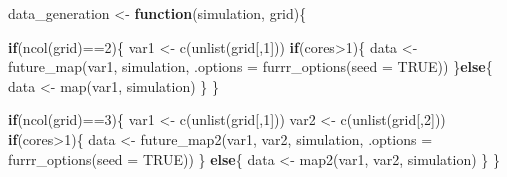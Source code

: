 \documentclass[11pt,a4paper]{article}
\newenvironment{Shaded}{\begin{snugshade}}{\end{snugshade}}
\newcommand{\AttributeTok}[1]{\textcolor[rgb]{0.77,0.63,0.00}{#1}}
\newcommand{\ConstantTok}[1]{\textcolor[rgb]{0.00,0.00,0.00}{#1}}
\newcommand{\ControlFlowTok}[1]{\textcolor[rgb]{0.13,0.29,0.53}{\textbf{#1}}}
\newcommand{\DecValTok}[1]{\textcolor[rgb]{0.00,0.00,0.81}{#1}}
\newcommand{\FunctionTok}[1]{\textcolor[rgb]{0.00,0.00,0.00}{#1}}
\newcommand{\NormalTok}[1]{#1}
\newcommand{\OtherTok}[1]{\textcolor[rgb]{0.56,0.35,0.01}{#1}}
\newcommand{\SpecialCharTok}[1]{\textcolor[rgb]{0.00,0.00,0.00}{#1}}
\begin{document}
\begin{Shaded}
\begin{Highlighting}[]
\NormalTok{data\_generation }\OtherTok{\textless{}{-}} \ControlFlowTok{function}\NormalTok{(simulation, grid)\{}
  
  \ControlFlowTok{if}\NormalTok{(}\FunctionTok{ncol}\NormalTok{(grid)}\SpecialCharTok{==}\DecValTok{2}\NormalTok{)\{}
\NormalTok{    var1 }\OtherTok{\textless{}{-}} \FunctionTok{c}\NormalTok{(}\FunctionTok{unlist}\NormalTok{(grid[,}\DecValTok{1}\NormalTok{]))}
    \ControlFlowTok{if}\NormalTok{(cores}\SpecialCharTok{\textgreater{}}\DecValTok{1}\NormalTok{)\{}
\NormalTok{      data }\OtherTok{\textless{}{-}} \FunctionTok{future\_map}\NormalTok{(var1, simulation,}
                         \AttributeTok{.options =} \FunctionTok{furrr\_options}\NormalTok{(}\AttributeTok{seed =} \ConstantTok{TRUE}\NormalTok{))}
\NormalTok{    \}}\ControlFlowTok{else}\NormalTok{\{}
\NormalTok{      data }\OtherTok{\textless{}{-}} \FunctionTok{map}\NormalTok{(var1, simulation)}
\NormalTok{    \}}
\NormalTok{  \}}
  
  \ControlFlowTok{if}\NormalTok{(}\FunctionTok{ncol}\NormalTok{(grid)}\SpecialCharTok{==}\DecValTok{3}\NormalTok{)\{}
\NormalTok{    var1 }\OtherTok{\textless{}{-}} \FunctionTok{c}\NormalTok{(}\FunctionTok{unlist}\NormalTok{(grid[,}\DecValTok{1}\NormalTok{]))}
\NormalTok{    var2 }\OtherTok{\textless{}{-}} \FunctionTok{c}\NormalTok{(}\FunctionTok{unlist}\NormalTok{(grid[,}\DecValTok{2}\NormalTok{]))}
    \ControlFlowTok{if}\NormalTok{(cores}\SpecialCharTok{\textgreater{}}\DecValTok{1}\NormalTok{)\{}
\NormalTok{      data }\OtherTok{\textless{}{-}} \FunctionTok{future\_map2}\NormalTok{(var1, var2, simulation,}
                          \AttributeTok{.options =} \FunctionTok{furrr\_options}\NormalTok{(}\AttributeTok{seed =} \ConstantTok{TRUE}\NormalTok{))}
\NormalTok{    \} }\ControlFlowTok{else}\NormalTok{\{}
\NormalTok{      data }\OtherTok{\textless{}{-}} \FunctionTok{map2}\NormalTok{(var1, var2, simulation)}
\NormalTok{    \}}
\NormalTok{  \} }
  

\end{Highlighting}
\end{Shaded}
\end{document}
